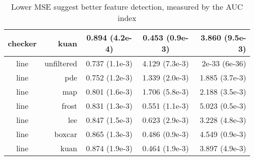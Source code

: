 \documentclass[journal]{IEEEtran}
\begin{document}
\begin{table}
\begin{tabular}{c|r|c|c|r}
 checker  &  kuan  &  0.894 (4.2e-4)  &  0.453 (0.9e-3)  &  3.860 (9.5e-3)\\
\hline
 line  &  unfiltered  &  0.737 (1.1e-3)  &  4.129 (7.3e-3)  &  2e-33 (6e-36)\\
 line  &  pde  &  0.752 (1.2e-3)  &  1.339 (2.0e-3)  &  1.885 (3.7e-3)\\
 line  &  map  &  0.801 (1.6e-3)  &  1.706 (5.8e-3)  &  2.188 (3.5e-3)\\
 line  &  frost  &  0.831 (1.3e-3)  &  0.551 (1.1e-3)  &  5.023 (0.5e-3)\\
 line  &  lee  &  0.847 (1.5e-3)  &  0.623 (2.9e-3)  &  3.228 (4.8e-3)\\
 line  &  boxcar  &  0.865 (1.3e-3)  &  0.486 (0.9e-3)  &  4.549 (0.9e-3)\\
 line  &  kuan  &  0.874 (1.9e-3)  &  0.464 (1.9e-3)  &  3.897 (4.9e-3)\\
\hline

\end{tabular}

\caption{Lower MSE suggest better feature detection, measured by the AUC index}
\label{tab:mse_auc_in_log_domain}
\end{table}
\end{document}
